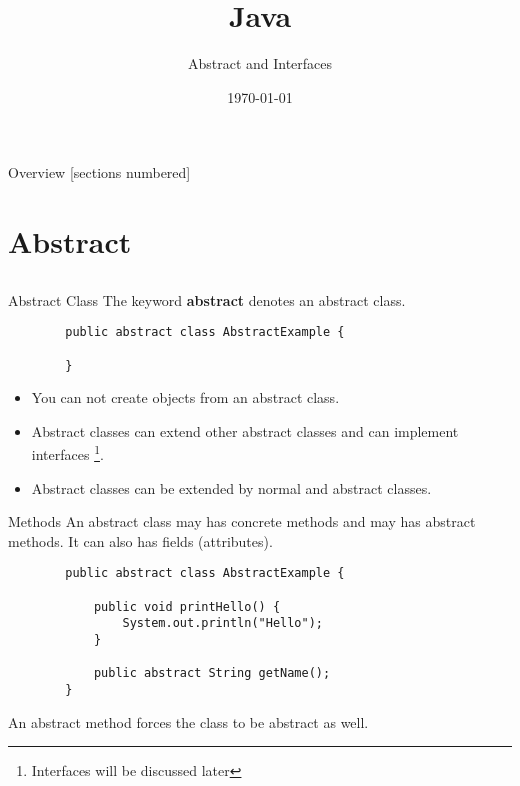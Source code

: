 


\usepackage{hyperref}

\title{Java}
\subtitle{Abstract and Interfaces}
\date{\today}


	
	\begin{frame}
		\titlepage
	\end{frame}
	\begin{frame}{Overview}
		[sections numbered]
		\tableofcontents
	\end{frame}

\section{Abstract}
\subsection{}
\begin{frame}[fragile]{Abstract Class}
	The keyword \textbf{abstract} denotes an abstract class.
	\vfill
	\begin{lstlisting}
		public abstract class AbstractExample {
			
		}	
	\end{lstlisting}
	\vfill
	\begin{itemize}
		\item You can not create objects from an abstract class.\\
		\item Abstract classes can extend other abstract classes and can implement interfaces \footnote[1]{Interfaces will be discussed later}.\\
		\item Abstract classes can be extended by normal and abstract classes.
	\end{itemize}
\end{frame}

\begin{frame}[fragile]{Methods}
	An abstract class may has concrete methods and may has abstract methods. It can also has fields (attributes).
	\begin{lstlisting}
		public abstract class AbstractExample {
			
			public void printHello() {
				System.out.println("Hello");	    
			}
			
			public abstract String getName();
		}	
	\end{lstlisting}
	An abstract method forces the class to be abstract as well. \\
\end{frame}

